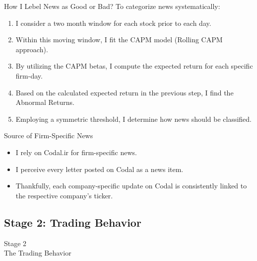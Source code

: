 \documentclass{beamer}
\begin{document}
\begin{frame}{How I Lebel News as Good or Bad?}
    To categorize news systematically:
    \begin{enumerate}
        \item I consider a two month window for each stock prior to each day.
        \item Within this moving window, I fit the CAPM model (Rolling CAPM approach).
        \item By utilizing the CAPM betas, I compute the expected return for each specific firm-day.
        \item Based on the calculated expected return in the previous step, I find the Abnormal Returns.
        \item Employing a symmetric threshold, I determine how news should be classified.
    \end{enumerate}
\end{frame}

\begin{frame}{Source of Firm-Specific News}
    \begin{itemize}
        \item I rely on Codal.ir for firm-specific news.
        \item I perceive every letter posted on Codal as a news item.
        \item Thankfully, each company-specific update on Codal is consistently linked to the respective company's ticker.
    \end{itemize}
\end{frame}


\subsection{Stage 2: Trading Behavior}


\begin{frame}
    \Huge
    \center
    Stage 2
    \\
    The Trading Behavior
\end{frame}
\end{document}

